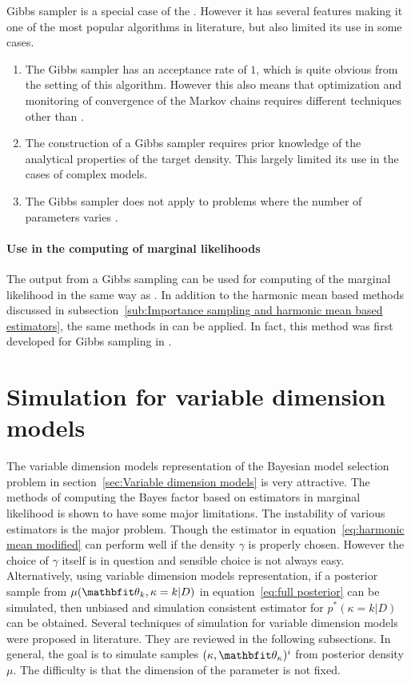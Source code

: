 Gibbs sampler is a special case of the \mha
\parencite[see][chap.~10]{Robert2004}. However it has several features making
it one of the most popular \mcmc algorithms in literature, but also limited
its use in some cases.
\begin{enumerate}
  \item The Gibbs sampler has an acceptance rate of $1$, which is quite
    obvious from the setting of this algorithm. However this also means that
    optimization and monitoring of convergence of the Markov chains requires
    different techniques other than \mha.
  \item The construction of a Gibbs sampler requires prior knowledge of the
    analytical properties of the target density. This largely limited its use
    in the cases of complex models.
  \item The Gibbs sampler does not apply to problems where the number of
    parameters varies \parencite[see][chap.~10]{Robert2004}.
\end{enumerate}

\paragraph{Use in the computing of marginal likelihoods} The output from a
Gibbs sampling can be used for computing of the marginal likelihood in the
same way as \mha. In addition to the harmonic mean based methods discussed in
subsection~\ref{sub:Importance sampling and harmonic mean based estimators},
the same methods in \textcite{Chib2001} can be applied. In fact, this method
was first developed for Gibbs sampling in \textcite{Chib1995}.

\section{Simulation for variable dimension models}
\label{sec:Simulation for variable dimension models}

The variable dimension models representation of the Bayesian model selection
problem in section~\ref{sec:Variable dimension models} is very attractive. The
methods of computing the Bayes factor based on estimators in marginal
likelihood is shown to have some major limitations. The instability of various
estimators is the major problem. Though the estimator in
equation~\eqref{eq:harmonic mean modified} can perform well if the density
$\gamma$ is properly chosen. However the choice of $\gamma$ itself is in
question and sensible choice is not always easy. Alternatively, using variable
dimension models representation, if a posterior sample from
$\mu(\bth_k,\kappa=k|D)$ in equation~\eqref{eq:full posterior} can be
simulated, then unbiased and simulation consistent estimator for
$p^*(\kappa=k|D)$ can be obtained. Several techniques of simulation for
variable dimension models were proposed in literature. They are reviewed in
the following subsections. In general, the goal is to simulate samples
$(\kappa, \bth_{\kappa})^i$ from posterior density $\mu$. The difficulty is
that the dimension of the parameter is not fixed.


